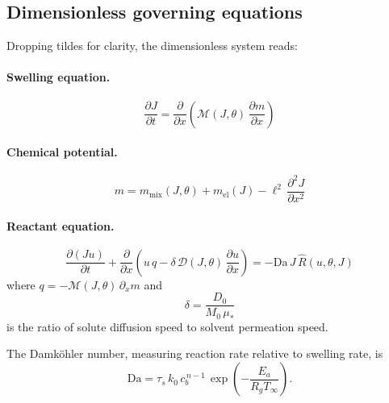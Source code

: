 \documentclass[aps,pre,reprint,superscriptaddress,longbibliography,floatfix]{revtex4-2}
\newcommand{\Ms}{\mathcal{M}}
\newcommand{\Ds}{\mathcal{D}}
\newcommand{\Da}{\mathrm{Da}}
\newcommand{\Rhat}{\widehat{R}}
\begin{document}
\subsection{Dimensionless governing equations}

Dropping tildes for clarity, the dimensionless system reads:

\paragraph{Swelling equation.}
\begin{equation}
  \boxed{
  \frac{\partial J}{\partial t}
  = \frac{\partial}{\partial x}\!\left(\Ms(J,\theta)\,\frac{\partial m}{\partial x}\right)
  }
  \label{eq:J_nondim}
\end{equation}

\paragraph{Chemical potential.}
\begin{equation}
  \boxed{
  m = m_\mathrm{mix}(J,\theta) + m_\mathrm{el}(J) - \ell^2\,\frac{\partial^2 J}{\partial x^2}
  }
  \label{eq:m_nondim_box}
\end{equation}

\paragraph{Reactant equation.}
\begin{equation}
  \boxed{
  \frac{\partial(J u)}{\partial t}
  + \frac{\partial}{\partial x}\!\left(u\,q - \delta\,\Ds(J,\theta)\,\frac{\partial u}{\partial x}\right)
  = -\Da\,J\,\Rhat(u,\theta,J)
  }
  \label{eq:u_nondim}
\end{equation}
where $q = -\Ms(J,\theta)\,\partial_x m$ and
\begin{equation}
  \delta = \frac{D_0}{M_0\,\mu_*}
\end{equation}
is the ratio of solute diffusion speed to solvent permeation speed.

The Damk\"ohler number, measuring reaction rate relative to swelling rate, is
\begin{equation}
  \Da = \tau_s\,k_0\,c_b^{\,n-1}\,\exp\!\left(-\frac{E_a}{R_g T_\infty}\right).
  \label{eq:Da}
\end{equation}
\end{document}
